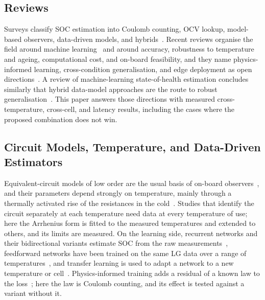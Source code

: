\documentclass[journal]{IEEEtran}
\begin{document}
\subsection{Reviews}
Surveys classify SOC estimation into Coulomb counting, OCV lookup, model-based observers, data-driven models, and hybrids~\cite{xiong2018review,hannan2017review}. Recent reviews organise the field around machine learning~\cite{zhao2024wevj} and around accuracy, robustness to temperature and ageing, computational cost, and on-board feasibility, and they name physics-informed learning, cross-condition generalisation, and edge deployment as open directions~\cite{hu2026ionics}. A review of machine-learning state-of-health estimation concludes similarly that hybrid data-model approaches are the route to robust generalisation~\cite{wang2025rser}. This paper answers those directions with measured cross-temperature, cross-cell, and latency results, including the cases where the proposed combination does not win.

\subsection{Circuit Models, Temperature, and Data-Driven Estimators}
Equivalent-circuit models of low order are the usual basis of on-board observers~\cite{hu2012ecm,plett2015bms}, and their parameters depend strongly on temperature, mainly through a thermally activated rise of the resistances in the cold~\cite{jaguemont2016cold,waag2014review}. Studies that identify the circuit separately at each temperature need data at every temperature of use; here the Arrhenius form is fitted to the measured temperatures and extended to others, and its limits are measured. On the learning side, recurrent networks and their bidirectional variants estimate SOC from the raw measurements~\cite{chemali2017lstm,bian2020bilstm,hochreiter1997lstm,schuster1997birnn}, feedforward networks have been trained on the same LG data over a range of temperatures~\cite{vidal2020ffnn}, and transfer learning is used to adapt a network to a new temperature or cell~\cite{vidal2019transfer,pan2010transfer}. Physics-informed training adds a residual of a known law to the loss~\cite{raissi2019pinn}; here the law is Coulomb counting, and its effect is tested against a variant without it.
\end{document}

